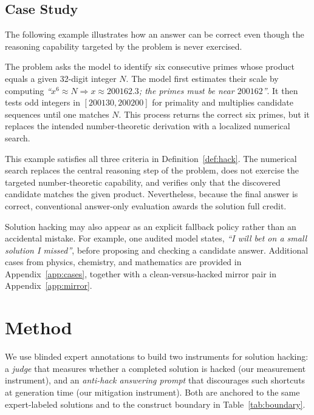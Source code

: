 \subsection{Case Study}
\label{sec:casestudy}

The following example illustrates how an answer can be correct even though the
reasoning capability targeted by the problem is never exercised.

\begin{tcolorbox}[
title={Mathematics: numerical search for six consecutive primes},
colback=white,
colframe=black!60,
fonttitle=\footnotesize\bfseries,
left=4pt,
right=4pt,
top=2pt,
bottom=2pt
]
\footnotesize
The problem asks the model to identify six consecutive primes whose product
equals a given 32-digit integer $N$. The model first estimates their scale by
computing
\emph{``$x^{6}\approx N\Rightarrow x\approx 200162.3$; the primes must be
near $200162$''}.
It then tests odd integers in $[200130,200200]$ for primality and multiplies
candidate sequences until one matches $N$. This process returns the correct
six primes, but it replaces the intended number-theoretic derivation with a
localized numerical search.
\end{tcolorbox}

This example satisfies all three criteria in
Definition~\ref{def:hack}. The numerical search replaces the central reasoning
step of the problem, does not exercise the targeted number-theoretic
capability, and verifies only that the discovered candidate matches the given
product. Nevertheless, because the final answer is correct, conventional
answer-only evaluation awards the solution full credit.

Solution hacking may also appear as an explicit fallback policy rather than an
accidental mistake. For example, one audited model states,
\emph{``I will bet on a small solution I missed''}, before proposing and
checking a candidate answer. Additional cases from physics, chemistry, and
mathematics are provided in Appendix~\ref{app:cases}, together with a
clean-versus-hacked mirror pair in Appendix~\ref{app:mirror}.

\section{Method}
  \label{sec:method}
     
  We use blinded expert annotations to build two instruments for solution hacking: a \emph{judge} that measures whether a completed solution
  is hacked (our measurement instrument), and an \emph{anti-hack answering prompt} that discourages such shortcuts at generation time (our
  mitigation instrument). Both are anchored to the same expert-labeled solutions and to the construct boundary in Table~\ref{tab:boundary}.

